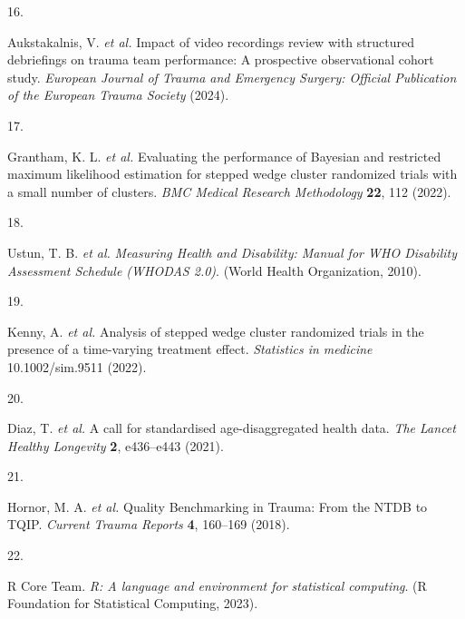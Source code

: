 \documentclass[
]{scrartcl}
\newlength{\cslhangindent}
\newlength{\csllabelwidth}
\newenvironment{CSLReferences}[2] %
 {\begin{list}{}{%
  \setlength{\itemindent}{0pt}
  \setlength{\leftmargin}{0pt}
  \setlength{\parsep}{0pt}
  \ifodd #1
   \setlength{\leftmargin}{\cslhangindent}
   \setlength{\itemindent}{-1\cslhangindent}
  \fi
  \setlength{\itemsep}{#2\baselineskip}}}
 {\end{list}}
\newcommand{\CSLLeftMargin}[1]{\parbox[t]{\csllabelwidth}{\strut#1\strut}}
\newcommand{\CSLRightInline}[1]{\parbox[t]{\linewidth - \csllabelwidth}{\strut#1\strut}}
\begin{document}
\begin{CSLReferences}{0}{0}
\CSLLeftMargin{16. }%
\CSLRightInline{Aukstakalnis, V. \emph{et al.} Impact of video
recordings review with structured debriefings on trauma team
performance: A prospective observational cohort study. \emph{European
Journal of Trauma and Emergency Surgery: Official Publication of the
European Trauma Society} (2024).}

\CSLLeftMargin{17. }%
\CSLRightInline{Grantham, K. L. \emph{et al.} Evaluating the performance
of {Bayesian} and restricted maximum likelihood estimation for stepped
wedge cluster randomized trials with a small number of clusters.
\emph{BMC Medical Research Methodology} \textbf{22}, 112 (2022).}

\CSLLeftMargin{18. }%
\CSLRightInline{Ustun, T. B. \emph{et al.} \emph{Measuring {Health} and
{Disability}: {Manual} for {WHO} {Disability} {Assessment} {Schedule}
({WHODAS} 2.0)}. (World Health Organization, 2010).}

\CSLLeftMargin{19. }%
\CSLRightInline{Kenny, A. \emph{et al.} Analysis of stepped wedge
cluster randomized trials in the presence of a time-varying treatment
effect. \emph{Statistics in medicine} 10.1002/sim.9511 (2022).}

\CSLLeftMargin{20. }%
\CSLRightInline{Diaz, T. \emph{et al.} A call for standardised
age-disaggregated health data. \emph{The Lancet Healthy Longevity}
\textbf{2}, e436--e443 (2021).}

\CSLLeftMargin{21. }%
\CSLRightInline{Hornor, M. A. \emph{et al.} Quality {Benchmarking} in
{Trauma}: From the {NTDB} to {TQIP}. \emph{Current Trauma Reports}
\textbf{4}, 160--169 (2018).}

\CSLLeftMargin{22. }%
\CSLRightInline{R Core Team. \emph{R: A language and environment for
statistical computing}. (R Foundation for Statistical Computing, 2023).}

\end{CSLReferences}
\end{document}

